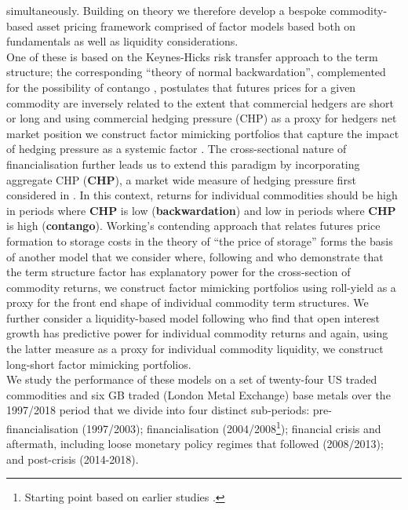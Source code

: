 \documentclass[
  authoryear,
  preprint,
  3p]{elsarticle}
\begin{document}
simultaneously. Building on theory we therefore develop a bespoke
commodity-based asset pricing framework comprised of factor models based
both on fundamentals as well as liquidity considerations.\\
One of these is based on the Keynes-Hicks
\citep{keynes_some_1923, keynes_treatise_1930, hicks_value_1939, hicks_value_1946}
risk transfer approach to the term structure; the corresponding ``theory
of normal backwardation'', complemented for the possibility of contango
\citep{houthakker_restatement_1957, cootner_returns_1960}, postulates
that futures prices for a given commodity are inversely related to the
extent that commercial hedgers are short or long and using commercial
hedging pressure (CHP) as a proxy for hedgers net market position we
construct factor mimicking portfolios that capture the impact of hedging
pressure as a systemic factor \citep{basu_capturing_2013}. The
cross-sectional nature of financialisation
\citep{cheng_financialisation_2014, basak_model_2016} further leads us
to extend this paradigm by incorporating aggregate CHP (\textbf{CHP}), a
market wide measure of hedging pressure first considered in
\citet{hong_what_2012}. In this context, returns for individual
commodities should be high in periods where \textbf{CHP} is low
(\textbf{backwardation}) and low in periods where \textbf{CHP} is high
(\textbf{contango}). Working's contending approach that relates futures
price formation to storage costs in the theory of ``the price of
storage'' \citep{working_theory_1949} forms the basis of another model
that we consider where, following \citet{szymanowska_anatomy_2014} and
\citet{fuertes_commodity_2015} who demonstrate that the term structure
factor has explanatory power for the cross-section of commodity returns,
we construct factor mimicking portfolios using roll-yield as a proxy for
the front end shape of individual commodity term structures. We further
consider a liquidity-based model following \citet{hong_what_2012} who
find that open interest growth has predictive power for individual
commodity returns and again, using the latter measure as a proxy for
individual commodity liquidity, we construct long-short factor mimicking
portfolios.\\
We study the performance of these models on a set of twenty-four US
traded commodities and six GB traded (London Metal Exchange) base metals
over the 1997/2018 period that we divide into four distinct sub-periods:
pre-financialisation (1997/2003); financialisation
(2004/2008\footnote{Starting point based on earlier studies
  \citep{baker_financialization_2021, christoffersen_factor_2014}.});
financial crisis and aftermath, including loose monetary policy regimes
that followed (2008/2013); and post-crisis (2014-2018).
\end{document}
